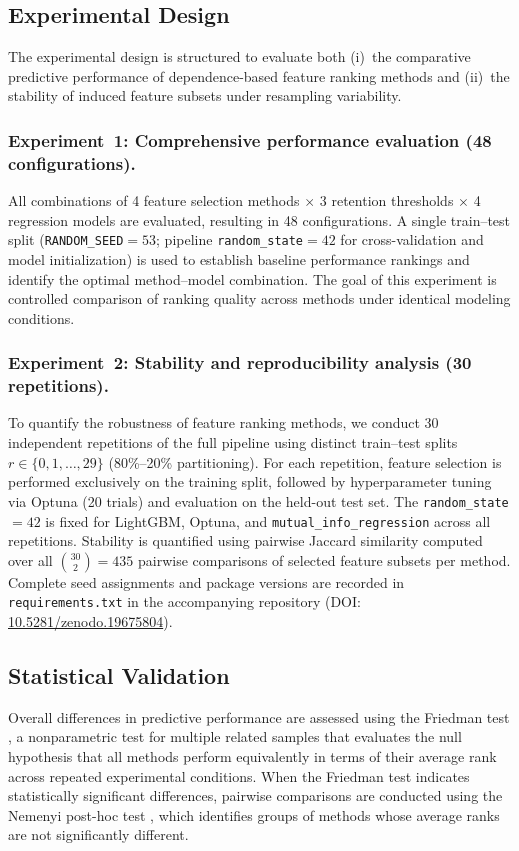 \documentclass[twoside,11pt]{article}
\begin{document}
\subsection{Experimental Design}
The experimental design is structured to evaluate both (i)~the comparative
predictive performance of dependence-based feature ranking methods and
(ii)~the stability of induced feature subsets under resampling variability.

\subsubsection{Experiment~1: Comprehensive performance evaluation (48 configurations).}
All combinations of 4 feature selection methods $\times$ 3 retention thresholds
$\times$ 4 regression models are evaluated, resulting in 48 configurations.
A single train--test split (\texttt{RANDOM\_SEED}$= 53$; pipeline
\texttt{random\_state}$= 42$ for cross-validation and model initialization) is
used to establish baseline performance rankings and identify the optimal
method--model combination. The goal of this experiment is controlled comparison
of ranking quality across methods under identical modeling conditions.

\subsubsection{Experiment~2: Stability and reproducibility analysis (30 repetitions).}
To quantify the robustness of feature ranking methods, we conduct 30 independent
repetitions of the full pipeline using distinct train--test splits
$r \in \{0, 1, \ldots, 29\}$ (80\%--20\% partitioning). For each repetition,
feature selection is performed exclusively on the training split, followed by
hyperparameter tuning via Optuna (20 trials) and evaluation on the held-out
test set. The \texttt{random\_state}$= 42$ is fixed for LightGBM, Optuna, and
\texttt{mutual\_info\_regression} across all repetitions. Stability is quantified
using pairwise Jaccard similarity computed over all $\binom{30}{2} = 435$
pairwise comparisons of selected feature subsets per method. Complete seed
assignments and package versions are recorded in \texttt{requirements.txt} in
the accompanying repository
(DOI: \href{https://doi.org/10.5281/zenodo.19675804}{10.5281/zenodo.19675804}).

\subsection{Statistical Validation}
Overall differences in predictive performance are assessed using the Friedman
test \citep{Friedman1937ranks, Demvsar2006}, a nonparametric test for multiple
related samples that evaluates the null hypothesis that all methods perform
equivalently in terms of their average rank across repeated experimental
conditions. When the Friedman test indicates statistically significant
differences, pairwise comparisons are conducted using the Nemenyi post-hoc
test \citep{Demvsar2006}, which identifies groups of methods whose average ranks
are not significantly different.
\end{document}

